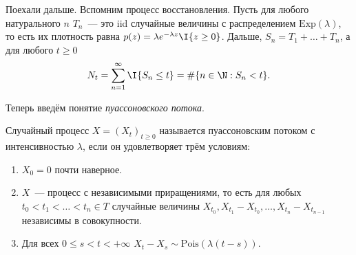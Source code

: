 Поехали дальше. Вспомним процесс восстановления. Пусть для любого натурального 
\(n\) \(T_{n}\)~--- это iid случайные величины с распределением 
\(\mathrm{Exp}(\lambda)\), то есть их плотность равна \(p(z) = \lambda 
e^{-\lambda z}\I\{z \geq 0\}\). Дальше, \(S_{n} = T_{1} + \ldots + T_{n}\), а 
для любого \(t 
\geq 0\)
\[
	N_{t} = \sum_{n = 1}^{\infty} \I\{S_{n} \leq t\} = \#\{n \in \N : S_{n} 
	< t\}.
\]

Теперь введём понятие \emph{пуассоновского потока}.
\begin{definition}
	Случайный процесс \(X = (X_{t})_{t \geq 0}\) называется пуассоновским 
	потоком с интенсивностью \(\lambda\), если он удовлетворяет трём условиям:
	\begin{enumerate}
		\item \(X_{0} = 0\) почти наверное.
		\item \(X\)~--- процесс с независимыми приращениями, то есть для любых 
		\(t_{0} < t_{1} < \ldots < t_{n} \in T\) случайные величины 
		\(X_{t_{0}}, X_{t_{1}} - X_{t_{0}}, \ldots, X_{t_{n}} - X_{t_{n - 1}}\) 
		независимы в совокупности.
		\item Для всех \(0 \leq s < t < +\infty\) \(X_{t} - X_{s} \sim 
		\mathrm{Pois}(\lambda(t - s))\).
	\end{enumerate}
\end{definition}

